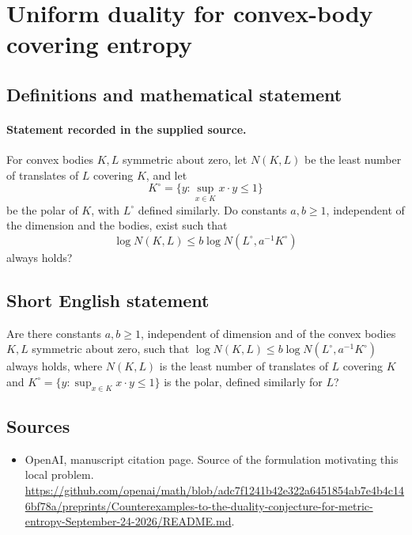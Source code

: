 \documentclass[11pt]{article}
\begin{document}
\section*{Uniform duality for convex-body covering entropy}\label{30007182}
\subsection{Definitions and mathematical statement}
\paragraph{Statement recorded in the supplied source.}
For convex bodies $K,L$ symmetric about zero, let $N(K,L)$ be the least number of translates of $L$ covering $K$, and let
\[
K^\circ=\{y:\sup_{x\in K}x\cdot y\leq1\}
\]
be the polar of $K$, with $L^\circ$ defined similarly. Do constants $a,b\geq1$, independent of the dimension and the bodies, exist such that
\[
\log N(K,L)\leq b\log N(L^\circ,a^{-1}K^\circ)
\]
always holds?
\subsection{Short English statement}
Are there constants $a,b\geq1$, independent of dimension and of the convex bodies $K,L$ symmetric about zero, such that $\log N(K,L)\leq b\log N(L^\circ,a^{-1}K^\circ)$ always holds, where $N(K,L)$ is the least number of translates of $L$ covering $K$ and $K^\circ=\{y:\sup_{x\in K}x\cdot y\leq1\}$ is the polar, defined similarly for $L$?
\subsection{Sources}
\begin{itemize}
\item[S1] OpenAI, manuscript citation page. Source of the formulation motivating this local problem.
\url{https://github.com/openai/math/blob/adc7f1241b42e322a6451854ab7e4b4c146bf78a/preprints/Counterexamples-to-the-duality-conjecture-for-metric-entropy-September-24-2026/README.md}.
\end{itemize}
\end{document}
